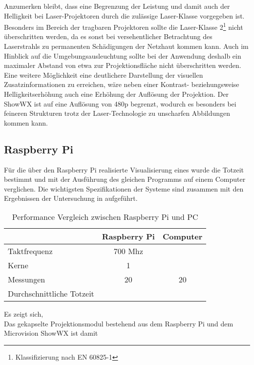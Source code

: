 Anzumerken bleibt, dass eine Begrenzung der Leistung und damit auch der Helligkeit bei Laser-Projektoren durch die zulässige Laser-Klasse vorgegeben ist. Besonders im Bereich der tragbaren Projektoren sollte die Laser-Klasse 2\footnote{Klassifizierung nach EN 60825-1} nicht überschritten werden, da es sonst bei versehentlicher Betrachtung des Laserstrahls zu permanenten Schädigungen der Netzhaut kommen kann. Auch im Hinblick auf die  Umgebungsausleuchtung sollte bei der Anwendung deshalb ein maximaler Abstand von etwa \red[TODO] zur Projektionsfläche nicht überschritten werden.\\

Eine weitere Möglichkeit eine deutlichere Darstellung der visuellen Zusatzinformationen zu erreichen, wäre neben einer Kontrast- beziehungsweise Helligkeitserhöhung auch eine Erhöhung der Auflösung der Projektion. Der ShowWX ist auf eine Auflösung von 480p begrenzt, wodurch es besonders bei feineren Strukturen trotz der Laser-Technologie zu unscharfen Abbildungen kommen kann.\\

\subsection{Raspberry Pi}
Für die über den Raspberry Pi realisierte Visualisierung eines  wurde die Totzeit bestimmt und mit der Ausführung des gleichen Programms auf einem Computer verglichen. Die wichtigsten Spezifikationen der Systeme sind zusammen mit den Ergebnissen der Untersuchung in  aufgeführt.

\begin{table}[ht]
\caption{Performance Vergleich zwischen Raspberry Pi und PC}
\begin{center}
\begin{tabular}{|l|c|c|}
\hline
\rowcolor{lightgray} & \multicolumn{1}{|c|}{\textbf{Raspberry Pi}} & \multicolumn{1}{|c|}{\textbf{Computer}}\\
\hline
Taktfrequenz & 700 Mhz & \\
\hline
Kerne & 1 & \\
\hline
Messungen & 20 & 20\\
\hline
Durchschnittliche Totzeit & & \\
\hline
\end{tabular}
\end{center}
\label{tab.totzeit}
\end{table}

Es zeigt sich, \red[TODO]\\
Das gekapselte Projektionsmodul bestehend aus dem Raspberry Pi und dem Microvision ShowWX ist damit \\

